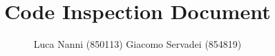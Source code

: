\documentclass[a4paper]{article}
\begin{document}
\title{Code Inspection Document}
\author{Luca Nanni (850113) \linebreak
	Giacomo Servadei (854819)}
\maketitle
\tableofcontents





\end{document}
